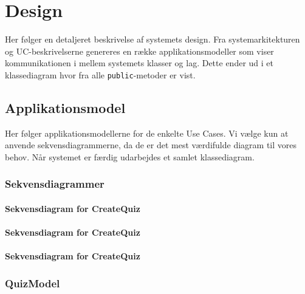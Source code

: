\chapter{Design}
Her følger en detaljeret beskrivelse af systemets design. Fra systemarkitekturen og UC-beskrivelserne genereres en række applikationsmodeller som viser kommunikationen i mellem systemets klasser og lag. Dette ender ud i et klassediagram hvor fra alle \verb+public+-metoder er vist.

\section{Applikationsmodel}
Her følger applikationsmodellerne for de enkelte Use Cases.
Vi vælge kun at anvende sekvensdiagrammerne, da de er det mest værdifulde diagram til vores behov. 
Når systemet er færdig udarbejdes et samlet klassediagram.

\subsection{Sekvensdiagrammer}

\subsubsection{Sekvensdiagram for CreateQuiz}


\subsubsection{Sekvensdiagram for CreateQuiz}


\subsubsection{Sekvensdiagram for CreateQuiz}


\subsection{QuizModel}

